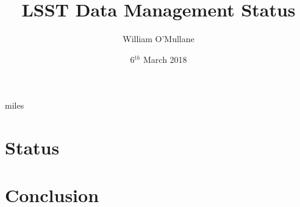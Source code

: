 \documentclass[t,aspectratio=169]{beamer}
\author{William O'Mullane}
\institute{AURA/LSST}
\title{LSST Data Management Status  }
\date{ 6$^{th}$ March 2018}
\begin{document}
\maketitle

 {miles}


\section{Status }







\section{Conclusion}


\appendix

\end{document}
